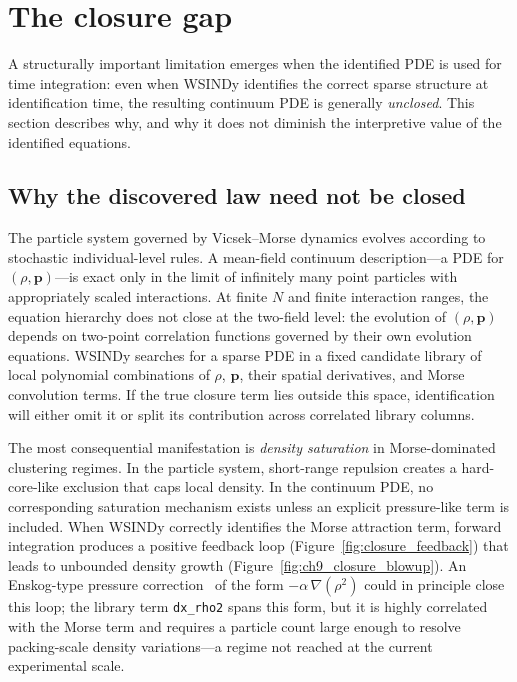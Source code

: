 \section{The closure gap}
\label{sec:closure_problem}

A structurally important limitation emerges when the identified PDE is used
for time integration: even when WSINDy identifies the correct sparse
structure at identification time, the resulting continuum PDE is generally
\emph{unclosed}.  This section describes why, and why it does not diminish
the interpretive value of the identified equations.

\subsection{Why the discovered law need not be closed}

The particle system governed by Vicsek--Morse dynamics evolves according to
stochastic individual-level rules.  A mean-field continuum
description---a PDE for $(\rho, \mathbf{p})$---is exact only in the limit
of infinitely many point particles with appropriately scaled interactions.
At finite $N$ and finite interaction ranges, the equation hierarchy does
not close at the two-field level: the evolution of $(\rho, \mathbf{p})$
depends on two-point correlation functions governed by their own evolution
equations.  WSINDy searches for a sparse PDE in a fixed candidate library
of local polynomial combinations of $\rho$, $\mathbf{p}$, their spatial
derivatives, and Morse convolution terms.  If the true closure term lies
outside this space, identification will either omit it or split its
contribution across correlated library columns.

The most consequential manifestation is \emph{density saturation} in
Morse-dominated clustering regimes.  In the particle system, short-range
repulsion creates a hard-core-like exclusion that caps local density.  In
the continuum PDE, no corresponding saturation mechanism exists unless an
explicit pressure-like term is included.  When WSINDy correctly identifies
the Morse attraction term, forward integration produces a positive feedback
loop (Figure~\ref{fig:closure_feedback}) that leads to unbounded density
growth (Figure~\ref{fig:ch9_closure_blowup}).  An Enskog-type pressure
correction~\cite{callaham2021dominant} of the form
$-\alpha\,\nabla(\rho^2)$ could in principle close this loop; the library
term \texttt{dx\_rho2} spans this form, but it is highly correlated with
the Morse term and requires a particle count large enough to resolve
packing-scale density variations---a regime not reached at the current
experimental scale.

